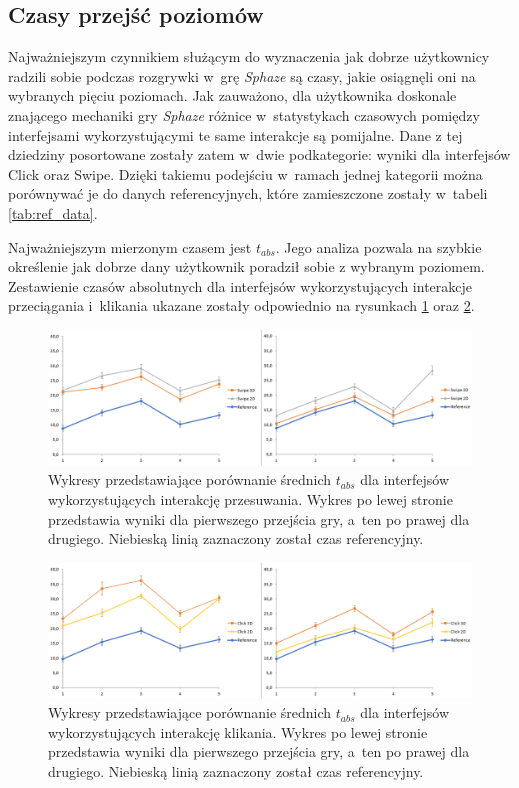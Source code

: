 \documentclass[a4paper,12pt,numbers=noenddot]{report}
\begin{document}
\subsection{Czasy przejść poziomów}
Najważniejszym czynnikiem służącym do wyznaczenia jak dobrze użytkownicy radzili sobie podczas rozgrywki w~grę \textit{Sphaze} są czasy, jakie osiągnęli oni na wybranych pięciu poziomach. Jak zauważono, dla użytkownika doskonale znającego mechaniki gry \textit{Sphaze} różnice w~statystykach czasowych pomiędzy interfejsami wykorzystującymi te same interakcje są pomijalne. Dane z tej dziedziny posortowane zostały zatem w~dwie podkategorie: wyniki dla interfejsów Click oraz Swipe. Dzięki takiemu podejściu w~ramach jednej kategorii można porównywać je do danych referencyjnych, które zamieszczone zostały w~tabeli \ref{tab:ref_data}. 

Najważniejszym mierzonym czasem jest $t_{abs}$. Jego analiza pozwala na szybkie określenie jak dobrze dany użytkownik poradził sobie z wybranym poziomem. Zestawienie czasów absolutnych dla interfejsów wykorzystujących interakcje przeciągania i~klikania ukazane zostały odpowiednio na rysunkach \ref{fig:diag:tAbs_Swipe12} oraz \ref{fig:diag:tAbs_Click12}.

\begin{figure}[h!]
	\centering
  	\includegraphics[width=\linewidth]{diag/tAbs_Swipe12.png}
	\caption{Wykresy przedstawiające porównanie średnich $t_{abs}$ dla interfejsów wykorzystujących interakcję przesuwania. Wykres po lewej stronie przedstawia wyniki dla pierwszego przejścia gry, a~ten po prawej dla drugiego. Niebieską linią zaznaczony został czas referencyjny.}
	\label{fig:diag:tAbs_Swipe12}
\end{figure}

\begin{figure}[h!]
	\centering
  	\includegraphics[width=\linewidth]{diag/tAbs_Click12.png}
	\caption{Wykresy przedstawiające porównanie średnich $t_{abs}$ dla interfejsów wykorzystujących interakcję klikania. Wykres po lewej stronie przedstawia wyniki dla pierwszego przejścia gry, a~ten po prawej dla drugiego. Niebieską linią zaznaczony został czas referencyjny.}
	\label{fig:diag:tAbs_Click12}
\end{figure}
\end{document}
